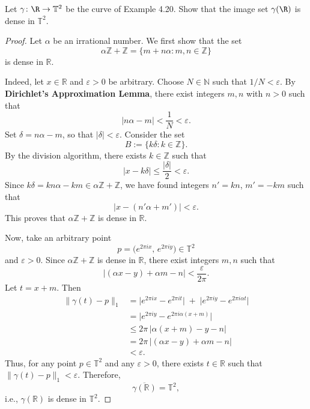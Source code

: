 \begin{problem}
    Let $\gamma \colon \R \to \mathbb{T}^2$ be the curve of Example 4.20. Show that the image set $\gamma(\R)$ is dense in $\mathbb{T}^2$.
    \begin{proof}
    Let $\alpha$ be an irrational number. We first show that the set 
    \[
    \alpha\mathbb{Z} + \mathbb{Z} = \{ m + n\alpha : m,n \in \mathbb{Z} \}
    \]
    is dense in $\mathbb{R}$.

    Indeed, let $x \in \mathbb{R}$ and $\varepsilon > 0$ be arbitrary. Choose $N \in \mathbb{N}$ such that $1/N < \varepsilon$. By \textbf{Dirichlet’s Approximation Lemma}, there exist integers $m,n$ with $n > 0$ such that 
    \[
    |n\alpha - m| < \frac{1}{N} < \varepsilon.
    \]
    Set $\delta = n\alpha - m$, so that $|\delta| < \varepsilon$. Consider the set
    \[
    B := \{ k\delta : k \in \mathbb{Z} \}.
    \]
    By the division algorithm, there exists $k \in \mathbb{Z}$ such that
    \[
    |x - k\delta| \le \frac{|\delta|}{2} < \varepsilon.
    \]
    Since $k\delta = kn\alpha - km \in \alpha\mathbb{Z} + \mathbb{Z}$, we have found integers $n' = kn$, $m' = -km$ such that
    \[
    |x - (n'\alpha + m')| < \varepsilon.
    \]
    This proves that $\alpha\mathbb{Z} + \mathbb{Z}$ is dense in $\mathbb{R}$.

    \medskip

    Now, take an arbitrary point 
    \[
    p = \big(e^{2\pi i x},\, e^{2\pi i y}\big) \in \mathbb{T}^2
    \]
    and $\varepsilon > 0$. Since $\alpha\mathbb{Z} + \mathbb{Z}$ is dense in $\mathbb{R}$, there exist integers $m, n$ such that
    \[
    |(\alpha x - y) + \alpha m - n| < \frac{\varepsilon}{2\pi}.
    \]
    Let $t = x + m$. Then
    \begin{align*}
    \|\gamma(t) - p\|_1
    &= \big| e^{2\pi i x} - e^{2\pi i t} \big| \;+\; \big| e^{2\pi i y} - e^{2\pi i \alpha t} \big| \\
    &= \big| e^{2\pi i y} - e^{2\pi i \alpha (x+m)} \big| \\
    &\le 2\pi\, \big| \alpha(x+m) - y - n \big| \\
    &= 2\pi\, \big| (\alpha x - y) + \alpha m - n \big| \\
    &< \varepsilon.
    \end{align*}
    Thus, for any point $p \in \mathbb{T}^2$ and any $\varepsilon > 0$, there exists $t \in \mathbb{R}$ such that $\|\gamma(t) - p\|_1 < \varepsilon$. Therefore,
    \[
    \overline{\gamma(\mathbb{R})} = \mathbb{T}^2,
    \]
    i.e., $\gamma(\mathbb{R})$ is dense in $\mathbb{T}^2$.
    \end{proof}
\end{problem}

